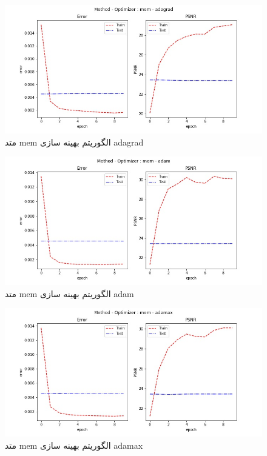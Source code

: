  \begin{figure}[!h] 
       \centering 
       \includegraphics[width=160mm]{./chapter3/images/error-psnr-mem-adagrad.jpg}
       \caption{متد mem الگوریتم بهینه سازی adagrad}
       \label{fig:error-psnr-mem-adagrad}
 \end{figure}
 \begin{figure}[!h] 
       \centering 
       \includegraphics[width=160mm]{./chapter3/images/error-psnr-mem-adam.jpg}
       \caption{متد mem الگوریتم بهینه سازی adam}
       \label{fig:error-psnr-mem-adam}
 \end{figure}
 \begin{figure}[!h] 
       \centering 
       \includegraphics[width=160mm]{./chapter3/images/error-psnr-mem-adamax.jpg}
       \caption{متد mem الگوریتم بهینه سازی adamax}
       \label{fig:error-psnr-mem-adamax}
 \end{figure}
